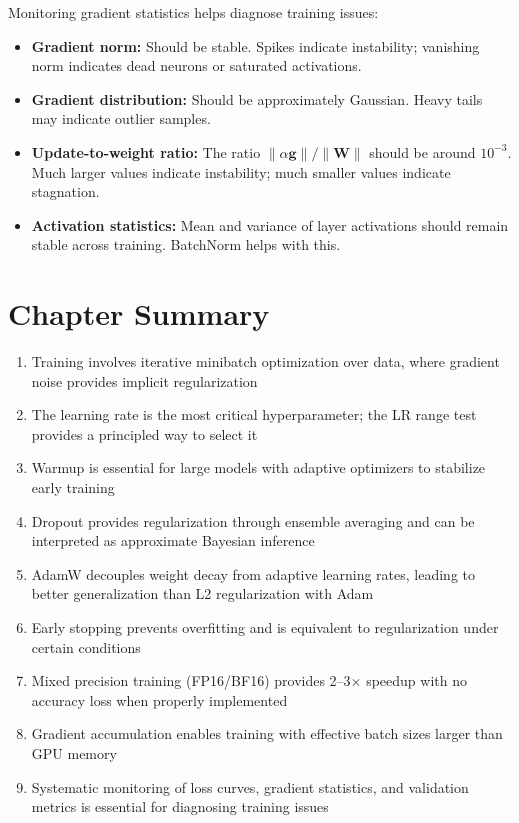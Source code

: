 Monitoring gradient statistics helps diagnose training issues:
\begin{itemize}
    \item \textbf{Gradient norm:} Should be stable. Spikes indicate instability; vanishing norm indicates dead neurons or saturated activations.
    \item \textbf{Gradient distribution:} Should be approximately Gaussian. Heavy tails may indicate outlier samples.
    \item \textbf{Update-to-weight ratio:} The ratio $\|\alpha \mathbf{g}\| / \|\mathbf{W}\|$ should be around $10^{-3}$. Much larger values indicate instability; much smaller values indicate stagnation.
    \item \textbf{Activation statistics:} Mean and variance of layer activations should remain stable across training. BatchNorm helps with this.
\end{itemize}

\section{Chapter Summary}

\begin{enumerate}
    \item Training involves iterative minibatch optimization over data, where gradient noise provides implicit regularization
    \item The learning rate is the most critical hyperparameter; the LR range test provides a principled way to select it
    \item Warmup is essential for large models with adaptive optimizers to stabilize early training
    \item Dropout provides regularization through ensemble averaging and can be interpreted as approximate Bayesian inference
    \item AdamW decouples weight decay from adaptive learning rates, leading to better generalization than L2 regularization with Adam
    \item Early stopping prevents overfitting and is equivalent to regularization under certain conditions
    \item Mixed precision training (FP16/BF16) provides 2--3$\times$ speedup with no accuracy loss when properly implemented
    \item Gradient accumulation enables training with effective batch sizes larger than GPU memory
    \item Systematic monitoring of loss curves, gradient statistics, and validation metrics is essential for diagnosing training issues
\end{enumerate}

